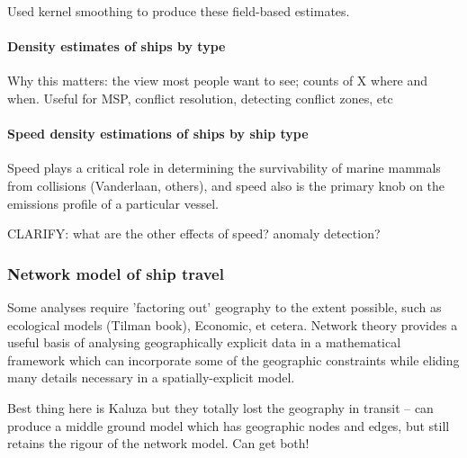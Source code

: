 Used kernel smoothing to produce these field-based estimates.

\paragraph{Density estimates of ships by type}

Why this matters: the view most people want to see; counts of X where and when. Useful for MSP, conflict resolution, detecting conflict zones, etc

\paragraph{Speed density estimations of ships by ship type}

Speed plays a critical role in determining the survivability of marine mammals from collisions (Vanderlaan, others), and speed also is the primary knob on the emissions profile of a particular vessel.

CLARIFY: what are the other effects of speed? anomaly detection?

\subsubsection{Network model of ship travel}

Some analyses require 'factoring out' geography to the extent possible, such as ecological models (Tilman book), Economic, et cetera. Network theory provides a useful basis of analysing geographically explicit data in a mathematical framework which can incorporate some of the geographic constraints while eliding many details necessary in a spatially-explicit model.

Best thing here is Kaluza but they totally lost the geography in transit -- can produce a middle ground model which has geographic nodes and edges, but still retains the rigour of the network model. Can get both!


